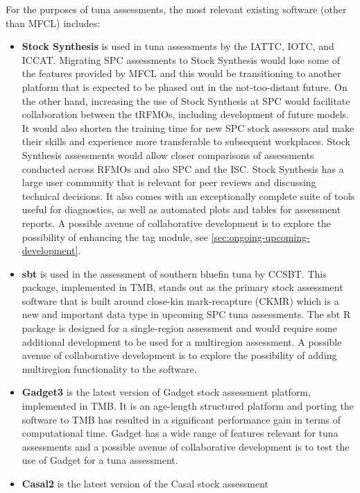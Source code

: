 \documentclass{SCreport}
\begin{document}
For the purposes of tuna assessments, the most relevant existing software (other
than MFCL) includes:

\begin{itemize}
  \item \textbf{Stock Synthesis} is used in tuna assessments by the IATTC, IOTC,
  and ICCAT. Migrating SPC assessments to Stock Synthesis would lose some of the
  features provided by MFCL and this would be transitioning to another platform
  that is expected to be phased out in the not-too-distant future. On the other
  hand, increasing the use of Stock Synthesis at SPC would facilitate
  collaboration between the tRFMOs, including development of future models. It
  would also shorten the training time for new SPC stock assessors and make
  their skills and experience more transferable to subsequent workplaces. Stock
  Synthesis assessments would allow closer comparisons of assessments conducted
  across RFMOs and also SPC and the ISC. Stock Synthesis has a large user
  community that is relevant for peer reviews and discussing technical
  decisions. It also comes with an exceptionally complete suite of tools useful
  for diagnostics, as well as automated plots and tables for assessment reports.
  A possible avenue of collaborative development is to explore the possibility
  of enhancing the tag module, see \autoref{sec:ongoing-upcoming-development}.
  \item \textbf{sbt} is used in the assessment of southern bluefin tuna by
  CCSBT. This package, implemented in TMB, stands out as the primary stock
  assessment software that is built around close-kin mark-recapture (CKMR) which
  is a new and important data type in upcoming SPC tuna assessments. The
  \textsf{sbt} R package is designed for a single-region assessment and would
  require some additional development to be used for a multiregion assessment. A
  possible avenue of collaborative development is to explore the possibility of
  adding multiregion functionality to the software.
  \item \textbf{Gadget3} is the latest version of Gadget stock assessment
  platform, implemented in TMB. It is an age-length structured platform and
  porting the software to TMB has resulted in a significant performance gain in
  terms of computational time. Gadget has a wide range of features relevant for
  tuna assessments and a possible avenue of collaborative development is to test
  the use of Gadget for a tuna assessment.
  \item \textbf{Casal2} is the latest version of the Casal stock assessment

\end{itemize}
\end{document}
